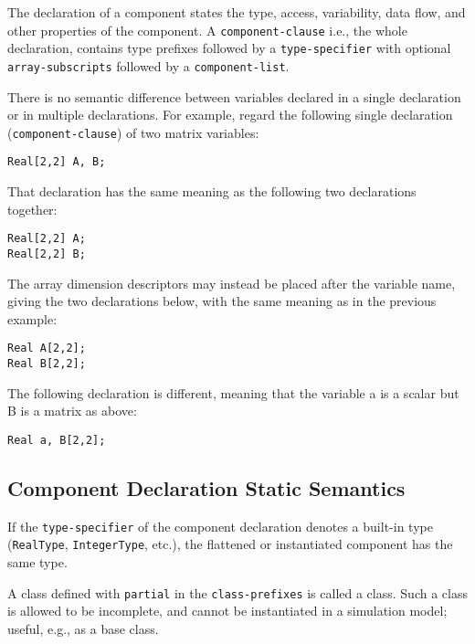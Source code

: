 \begin{nonnormative}
The declaration of a component states the type, access, variability, data flow, and other properties of the component.
A \lstinline[language=grammar]!component-clause! i.e., the whole declaration, contains type prefixes followed by a \lstinline[language=grammar]!type-specifier! with optional \lstinline[language=grammar]!array-subscripts! followed by a \lstinline[language=grammar]!component-list!.

There is no semantic difference between variables declared in a single declaration or in multiple declarations.
For example, regard the following single declaration (\lstinline[language=grammar]!component-clause!) of two matrix variables:
\begin{lstlisting}[language=modelica]
Real[2,2] A, B;
\end{lstlisting}
That declaration has the same meaning as the following two
declarations together:
\begin{lstlisting}[language=modelica]
Real[2,2] A;
Real[2,2] B;
\end{lstlisting}
The array dimension descriptors may instead be placed after the
variable name, giving the two declarations below, with the same meaning
as in the previous example:
\begin{lstlisting}[language=modelica]
Real A[2,2];
Real B[2,2];
\end{lstlisting}
The following declaration is different, meaning that the variable
a is a scalar but B is a matrix as above:
\begin{lstlisting}[language=modelica]
Real a, B[2,2];
\end{lstlisting}
\end{nonnormative}

\subsection{Component Declaration Static Semantics}\label{component-declaration-static-semantics}

If the \lstinline[language=grammar]!type-specifier! of the component declaration denotes a built-in type (\lstinline!RealType!, \lstinline!IntegerType!, etc.), the flattened or instantiated component has the same type.

A class defined with \lstinline!partial! in the \lstinline[language=grammar]!class-prefixes! is called a  class.
Such a class is allowed to be incomplete, and cannot be instantiated in a simulation model; useful, e.g., as a base class.

